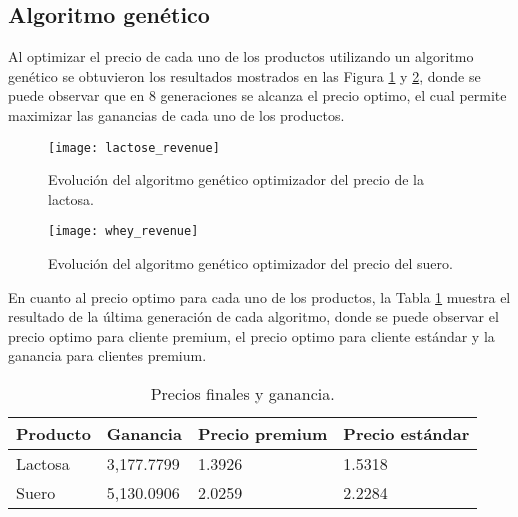 \newpage
\subsection{Algoritmo genético}
Al optimizar el precio de cada uno de los productos utilizando un algoritmo genético se obtuvieron los resultados mostrados en las Figura \ref{fig:AG_la} y \ref{fig:AG_su}, donde se puede observar que en 8 generaciones se alcanza el precio optimo, el cual permite maximizar las ganancias de cada uno de los productos. 

\begin{figure}[htbp]
\centering
\texttt{[image: lactose\_revenue]}
\caption{Evolución del algoritmo genético optimizador del precio de la lactosa.}
\label{fig:AG_la}
\end{figure}

\begin{figure}[htbp]
\centering
\texttt{[image: whey\_revenue]}
\caption{Evolución del algoritmo genético optimizador del precio del suero.}
\label{fig:AG_su}
\end{figure}

\newpage
En cuanto al precio optimo para cada uno de los productos, la Tabla \ref{tab:precios} muestra el resultado de la última generación de cada algoritmo, donde se puede observar el precio optimo para cliente premium, el precio optimo para cliente estándar y la ganancia para clientes premium.

\begin{table}[htbp]
\centering
\caption{Precios finales y ganancia.}
\begin{tabular}{llll}
\hline
Producto & Ganancia   & Precio premium & Precio estándar \\ \hline
Lactosa  & 3,177.7799 & 1.3926         & 1.5318          \\
Suero    & 5,130.0906 & 2.0259         & 2.2284          \\ \hline
\end{tabular}
\label{tab:precios}
\end{table}
